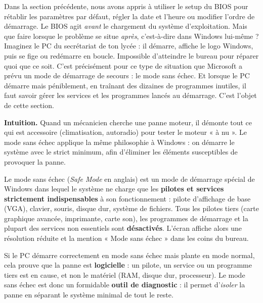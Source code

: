 \documentclass[11pt]{article}
\newcommand{\cle}[1]{{\popxbold\color{popdark}#1}}
\newcounter{popsec}
\newcounter{popsub}
\newcommand{\courssub}[1]{%
  \stepcounter{popsub}%
  \par\vspace{9pt}\noindent{\popxbold\fontsize{11.5}{13}\selectfont\color{popink}{\color{poporange}\thepopsec.\thepopsub}\hspace{6pt}#1}\par\nopagebreak\vspace{4pt}
}
\begin{document}
Dans la section précédente, nous avons appris à utiliser le \cle{setup du BIOS} pour rétablir les paramètres par défaut, régler la date et l'heure ou modifier l'ordre de démarrage. Le BIOS agit \emph{avant} le chargement du système d'exploitation. Mais que faire lorsque le problème se situe \emph{après}, c'est-à-dire dans Windows lui-même ? Imaginez le PC du secrétariat de ton lycée : il démarre, affiche le logo Windows, puis se fige ou redémarre en boucle. Impossible d'atteindre le bureau pour réparer quoi que ce soit. C'est précisément pour ce type de situation que Microsoft a prévu un mode de démarrage de secours : le \cle{mode sans échec}. Et lorsque le PC démarre mais péniblement, en traînant des dizaines de programmes inutiles, il faut savoir gérer les \cle{services} et les programmes lancés au démarrage. C'est l'objet de cette section.

\courssub{Le mode sans échec : définition et utilité}

\textbf{Intuition.} Quand un mécanicien cherche une panne moteur, il démonte tout ce qui est accessoire (climatisation, autoradio) pour tester le moteur « à nu ». Le mode sans échec applique la même philosophie à Windows : on démarre le système avec le strict minimum, afin d'éliminer les éléments susceptibles de provoquer la panne.

\begin{definition}
Le \cle{mode sans échec} (\emph{Safe Mode} en anglais) est un mode de démarrage spécial de Windows dans lequel le système ne charge que les \textbf{pilotes et services strictement indispensables} à son fonctionnement : pilote d'affichage de base (VGA), clavier, souris, disque dur, système de fichiers. Tous les pilotes tiers (carte graphique avancée, imprimante, carte son), les programmes de démarrage et la plupart des services non essentiels sont \textbf{désactivés}. L'écran affiche alors une résolution réduite et la mention « Mode sans échec » dans les coins du bureau.
\end{definition}

\begin{aretenir}
Si le PC démarre correctement en mode sans échec mais plante en mode normal, cela prouve que la panne est \textbf{logicielle} : un pilote, un service ou un programme tiers est en cause, et non le matériel (RAM, disque dur, processeur). Le mode sans échec est donc un formidable \textbf{outil de diagnostic} : il permet d'\emph{isoler} la panne en séparant le système minimal de tout le reste.
\end{aretenir}
\end{document}
